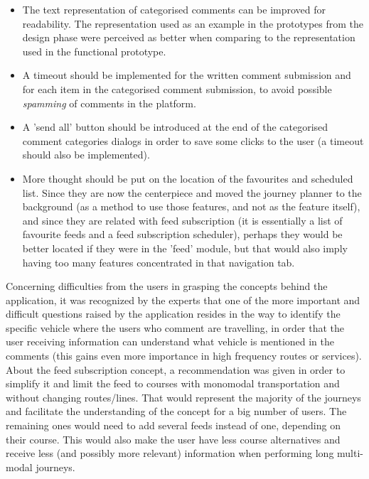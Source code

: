 \begin{itemize}
\item The text representation of categorised comments can be improved for readability. The representation used as an example in the prototypes from the design phase were perceived as better when comparing to the representation used in the functional prototype.

\item A timeout should be implemented for the written comment submission and for each item in the categorised comment submission, to avoid possible \emph{spamming} of comments in the platform.

\item A 'send all' button should be introduced at the end of the categorised comment categories dialogs in order to save some clicks to the user (a timeout should also be implemented).

\item More thought should be put on the location of the favourites and scheduled list. Since they are now the centerpiece and moved the journey planner to the background (as a method to use those features, and not as the feature itself), and since they are related with feed subscription (it is essentially a list of favourite feeds and a feed subscription scheduler), perhaps they would be better located if they were in the 'feed' module, but that would also imply having too many features concentrated in that navigation tab.
\end{itemize}

Concerning difficulties from the users in grasping the concepts behind the application, it was recognized by the experts that one of the more important and difficult questions raised by the application resides in the way to identify the specific vehicle where the users who comment are travelling, in order that the user receiving information can understand what vehicle is mentioned in the comments (this gains even more importance in high frequency routes or services).
About the feed subscription concept, a recommendation was given in order to simplify it and limit the feed to courses with monomodal transportation and without changing routes/lines. That would represent the majority of the journeys and facilitate the understanding of the concept for a big number of users. The remaining ones would need to add several feeds instead of one, depending on their course. This would also make the user have less course alternatives and receive less (and possibly more relevant) information when performing long multi-modal journeys.

